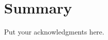 \documentclass[aps,prc,preprint,superscriptaddress]{revtex4}
\begin{document}
\section{Summary}




%




\begin{acknowledgments}
 Put your acknowledgments here.
\end{acknowledgments}


\end{document}
